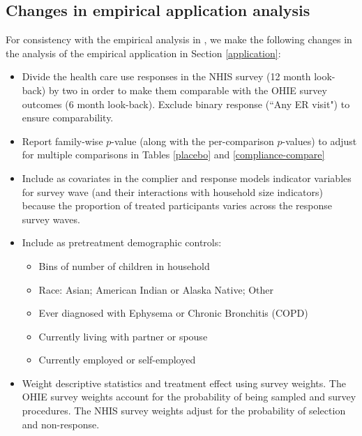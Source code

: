\documentclass[hidelinks,12pt,letterpaper]{article}
\begin{document}
\subsection{Changes in empirical application analysis}

For consistency with the empirical analysis in \citet{finkelstein2012}, we make the following changes in the analysis of the empirical application in Section \ref{application}:

\begin{itemize}
	\item Divide the health care use responses in the NHIS survey (12 month look-back) by two in order to make them comparable with the OHIE survey outcomes (6 month look-back). Exclude binary response (``Any ER visit") to ensure comparability. 
	\item Report family-wise $p$-value (along with the per-comparison $p$-values) to adjust for multiple comparisons in Tables \ref{placebo} and \ref{compliance-compare}
	\item Include as covariates in the complier and response models indicator variables for survey wave (and their interactions with household size indicators) because the proportion of treated participants varies across the response survey waves.
	\item Include as pretreatment demographic controls:
	\begin{itemize}
		\item Bins of number of children in household
		\item Race: Asian; American Indian or Alaska Native; Other
		\item Ever diagnosed with Ephysema or Chronic Bronchitis (COPD)
		\item Currently living with partner or spouse
		\item Currently employed or self-employed
	\end{itemize}
	\item Weight descriptive statistics and treatment effect using survey weights. The OHIE survey weights account for the probability of being sampled and survey procedures. The NHIS survey weights adjust for the probability of selection and
	non-response. 
\end{itemize}

\printbibliography
\end{document}
